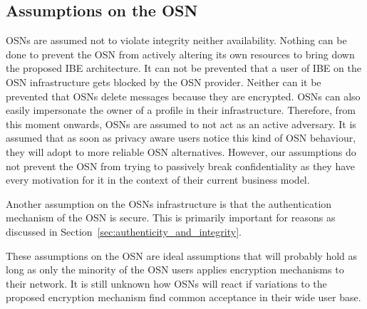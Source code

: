 \subsection{Assumptions on the OSN}
OSNs are assumed not to violate integrity neither availability. Nothing can be done to prevent the OSN from actively altering its own resources to bring down the proposed IBE architecture. It can not be prevented that a user of IBE on the OSN infrastructure gets blocked by the OSN provider. Neither can it be prevented that OSNs delete messages because they are encrypted. OSNs can also easily impersonate the owner of a profile in their infrastructure. Therefore, from this moment onwards, OSNs are assumed to not act as an active adversary. It is assumed that as soon as privacy aware users notice this kind of OSN behaviour, they will adopt to more reliable OSN alternatives. However, our assumptions do not prevent the OSN from trying to passively break confidentiality as they have every motivation for it in the context of their current business model.

Another assumption on the OSNs infrastructure is that the authentication mechanism of the OSN is secure. This is primarily important for reasons as discussed in Section~\ref{sec:authenticity_and_integrity}.

These assumptions on the OSN are ideal assumptions that will probably hold as long as only the minority of the OSN users applies encryption mechanisms to their network. It is still unknown how OSNs will react if variations to the proposed encryption mechanism find common acceptance in their wide user base.







